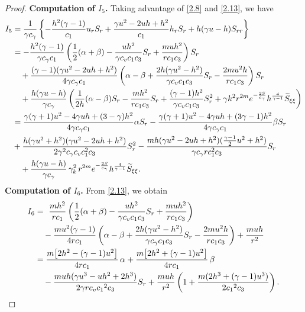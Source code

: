 \documentclass[10pt,a4paper]{amsart}
\begin{document}
\begin{proof}
\noindent\textbf{Computation of $I_5$.}
Taking advantage of \eqref{2.8} and \eqref{2.13}, we have
\begin{align}
I_5
&=\frac{1}{\gamma c_\gamma}\left\{-\frac{h^2(\gamma-1)}{c_1}u_rS_r+\frac{\gamma u^2-2uh+h^2}{c_1}h_rS_r+h(\gamma u-h)S_{rr}\right\}\nonumber\\
&= -\frac{h^2(\gamma-1)}{\gamma c_\gamma c_1} \left( \frac{1}{2}(\alpha + \beta) - \frac{uh^2}{\gamma c_v c_1 c_3} S_r + \frac{muh^2}{r c_1 c_3} \right) S_r \nonumber\\
&\quad + \frac{(\gamma-1)(\gamma u^2 - 2uh + h^2)}{4\gamma c_\gamma c_1} \left( \alpha - \beta + \frac{2h(\gamma u^2 - h^2)}{\gamma c_v c_1 c_3} S_r - \frac{2mu^2 h}{r c_1 c_3} \right) S_r \nonumber\\
&\quad + \frac{h(\gamma u - h)}{\gamma c_\gamma} \left( \frac{1}{2h}(\alpha - \beta) S_r - \frac{mh^2}{r c_1 c_3} S_r + \frac{(\gamma-1)h^2}{\gamma c_v c_1 c_3} S_r^2 + \gamma k^2 r^{2m} e^{-\frac{2S}{c_\gamma}} h^{\frac{4}{\gamma-1}} \widetilde{S}_{\xi\xi} \right)\nonumber\\
&=  \frac{\gamma(\gamma+1)u^2-4\gamma uh+(3-\gamma)h^2}{4\gamma c_\gamma c_1}\alpha S_r
- \frac{\gamma(\gamma+1)u^2-4\gamma uh+(3\gamma-1)h^2}{4\gamma c_\gamma c_1}\beta  S_r \nonumber\\
& + \frac{h(\gamma u^2+h^2)(\gamma u^2-2uh+h^2)}{2\gamma^2 c_\gamma c_v c_1^2c_3} S_r^2 - \frac{mh(\gamma u^2-2uh+h^2)(\frac{\gamma-1}{2}u^2+h^2)}{\gamma c_\gamma rc_1^2c_3} S_r \nonumber\\
&\quad+ \frac{h(\gamma u - h)}{\gamma c_\gamma} \, \gamma_k^2 \, r^{2m} e^{-\frac{2S}{c_\gamma}} h^{\frac{4}{\gamma-1}} \widetilde{S}_{\xi\xi}. \notag
   \end{align}
\noindent\textbf{Computation of $I_6$.}
From \eqref{2.13}, we obtain
\begin{align}
 I_6
  &=\ \frac{m h^2}{rc_1}\left( \frac12(\alpha+\beta) - \frac{uh^2}{\gamma c_v c_1 c_3}S_r + \frac{m u h^2}{rc_1 c_3} \right) \nonumber\\
  &\quad-\frac{m u^2(\gamma-1)}{4rc_1}\left( \alpha-\beta + \frac{2h(\gamma u^2-h^2)}{\gamma c_\gamma c_1 c_3}S_r - \frac{2m u^2 h}{rc_1 c_3} \right) +\frac{m u h}{r^2}\nonumber\\
  &= \frac{m\big[2h^2 - (\gamma-1)u^2\big]}{4r c_1} \,\alpha + \frac{m\big[2h^2 + (\gamma-1)u^2\big]}{4r c_1} \,\beta \nonumber\\
  &\quad - \frac{muh(\gamma u^3-uh^2+2h^3)}{2\gamma r c_v{c_1}^2 c_3}  S_r + \frac{m u h}{r^2}\left( 1 + \frac{m(2h^3 + (\gamma-1)u^3)}{2 {c_1}^2 c_3}  \right). \notag
\end{align}


\end{proof}
\end{document}
